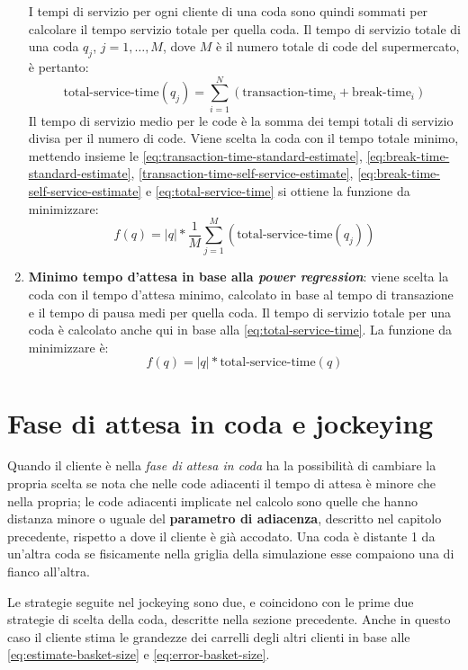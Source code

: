 \begin{enumerate}
I tempi di servizio per ogni cliente di una coda sono quindi sommati per calcolare il tempo servizio totale per quella coda. Il tempo di servizio totale di una coda $q_j$, $j = 1,\ldots ,M$, dove $M$ è il numero totale di code del supermercato, è pertanto:
\begin{equation}\label{eq:total-service-time}
\text{total-service-time}(q_j) = \sum\limits_{i=1}^N \left( \text{transaction-time}_i + \text{break-time}_i \right)
\end{equation}
Il tempo di servizio medio per le code è la somma dei tempi totali di servizio divisa per il numero di code. Viene scelta la coda con il tempo totale minimo, mettendo insieme le \ref{eq:transaction-time-standard-estimate}, \ref{eq:break-time-standard-estimate}, \ref{transaction-time-self-service-estimate}, \ref{eq:break-time-self-service-estimate} e \ref{eq:total-service-time} si ottiene la funzione da minimizzare:
\begin{equation}
f(q) = |q| * \frac{1}{M}\sum\limits_{j=1}^M \left( \text{total-service-time}(q_j) \right)
\end{equation}
\item \textbf{Minimo tempo d'attesa in base alla \textit{power regression}}: viene scelta la coda con il tempo d'attesa minimo, calcolato in base al tempo di transazione e il tempo di pausa medi per quella coda. Il tempo di servizio totale per una coda è calcolato anche qui in base alla \ref{eq:total-service-time}. La funzione da minimizzare è:
\begin{equation}
f(q) = |q| * \text{total-service-time}(q)
\end{equation}
\end{enumerate}

\section{Fase di attesa in coda e jockeying}

Quando il cliente è nella \textit{fase di attesa in coda} ha la possibilità di cambiare la propria scelta se nota che nelle code adiacenti il tempo di attesa è minore che nella propria; le code adiacenti implicate nel calcolo sono quelle che hanno distanza minore o uguale del \textbf{parametro di adiacenza}, descritto nel capitolo precedente, rispetto a dove il cliente è già accodato. Una coda è distante 1 da un'altra coda se fisicamente nella griglia della simulazione esse compaiono una di fianco all'altra.

Le strategie seguite nel jockeying sono due, e coincidono con le prime due strategie di scelta della coda, descritte nella sezione precedente. Anche in questo caso il cliente stima le grandezze dei carrelli degli altri clienti in base alle \ref{eq:estimate-basket-size} e \ref{eq:error-basket-size}.

